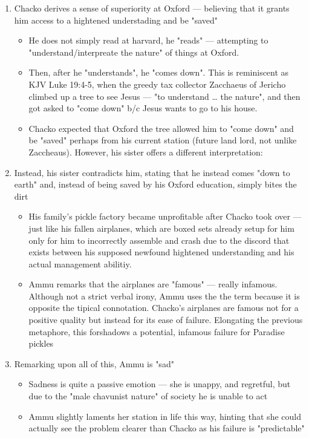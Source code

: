 \documentclass[letterpaper]{article}
\begin{document}
\begin{enumerate}
\item Chacko derives a sense of superiority at Oxford --- believing that it
grants him access to a hightened understading and be "saved"

\begin{itemize}
\item He does not simply read at harvard, he "reads" --- attempting to
"understand/interpreate the nature" of things at Oxford.
\item Then, after he "understands", he "comes down". This is reminiscent
as KJV Luke 19:4-5, when the greedy tax collector Zacchaeus of
Jericho climbed up a tree to see Jesus --- "to understand \ldots{} the
nature", and then got asked to "come down" b/c Jesus wants to go to
his house.
\item Chacko expected that Oxford the tree allowed him to "come down" and
be "saved" perhaps from his current station (future land lord, not
unlike Zaccheaus). However, his sister offers a different
interpretation:
\end{itemize}

\item Instead, his sister contradicts him, stating that he instead comes
"down to earth" and, instead of being saved by his Oxford education,
simply bites the dirt

\begin{itemize}
\item His family's pickle factory became unprofitable after Chacko took
over --- just like his fallen airplanes, which are boxed sets
already setup for him only for him to incorrectly assemble and
crash due to the discord that exists between his supposed newfound
hightened understanding and his actual management abilitiy.
\item Ammu remarks that the airplanes are "famous" --- really infamous.
Although not a strict verbal irony, Ammu uses the the term because
it is opposite the tipical connotation. Chacko's airplanes are
famous not for a positive quality but instead for its ease of
failure. Elongating the previous metaphore, this forshadows a
potential, infamous failure for Paradise pickles
\end{itemize}

\item Remarking upon all of this, Ammu is "sad"

\begin{itemize}
\item Sadness is quite a passive emotion --- she is unappy, and
regretful, but due to the "male chavunist nature" of society he is
unable to act
\item Ammu slightly laments her station in life this way, hinting that
she could actually see the problem clearer than Chacko as his
failure is "predictable"
\end{itemize}
\end{enumerate}
\end{document}
